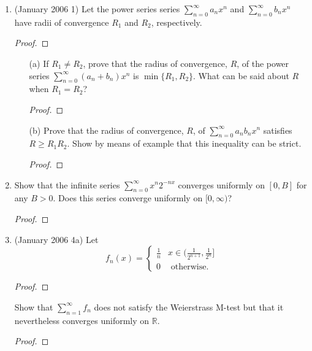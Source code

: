 \documentclass[reqno]{article}
\theoremstyle{remark}
\numberwithin{equation}{section}
\newcommand{\R}{\mathbb{R}}
\begin{document}
\begin{enumerate} 

\item (January 2006 1)  Let the power series series $\sum_{n=0}^\infty a_nx^n$ and $\sum_{n=0}^\infty b_nx^n$ have radii of convergence $R_1$ and $R_2$, respectively. 

	\begin{proof}
    
    \end{proof}

\begin{enumerate} 

\item[(a)] If $R_1 \neq R_2$, prove that the radius of convergence, $R$, of the power series $\sum_{n=0}^\infty (a_n+b_n)x^n$ is $\min\{R_1, R_2\}$. What can be said about $R$ when $R_1 = R_2$? 
	\begin{proof}
    
    \end{proof}

\item[(b)] Prove that the radius of convergence, $R$, of $\sum_{n=0}^\infty a_nb_nx^n$ satisfies $R \geq R_1R_2$. Show by means of example that this inequality can be strict.
	\begin{proof}
    
    \end{proof}

\end{enumerate} 

\item Show that the infinite series $\sum_{n=0}^\infty x^n2^{-nx}$ converges uniformly on $[0,B]$ for any $B > 0$. Does this series converge uniformly on $[0,\infty)$? 
	\begin{proof}
    
    \end{proof}

\item (January 2006 4a) Let $$f_n(x) = \begin{cases} \frac{1}{n}  & x \in (\frac{1}{2^{n+1}}, \frac{1}{2^n}] \\ 0 & \text{ otherwise}.\end{cases}$$
	\begin{proof}
    
    \end{proof}

Show that $\sum_{n=1}^\infty f_n$ does not satisfy the Weierstrass M-test but that it nevertheless converges uniformly on $\R$. 
	\begin{proof}
    

\end{proof}
\end{enumerate}
\end{document}
